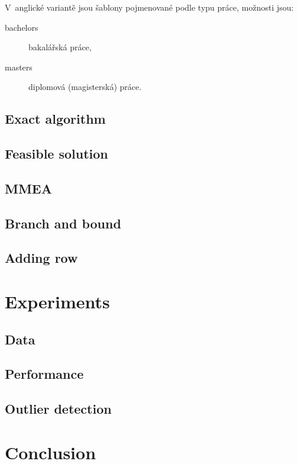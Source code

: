 \documentclass[thesis=B,english]{FITthesis}[2012/10/20]
\begin{document}
V~anglické variantě jsou šablony pojmenované podle typu práce, možnosti jsou:
\begin{description}
	\item[bachelors] bakalářská práce,
	\item[masters] diplomová (magisterská) práce.
\end{description}

\section{Exact algorithm}
\section{Feasible solution}
\section{MMEA}
\section{Branch and bound}
\section{Adding row}

\chapter{Experiments}
\section{Data}
\section{Performance}
\section{Outlier detection}

\chapter{Conclusion}
\end{document}
